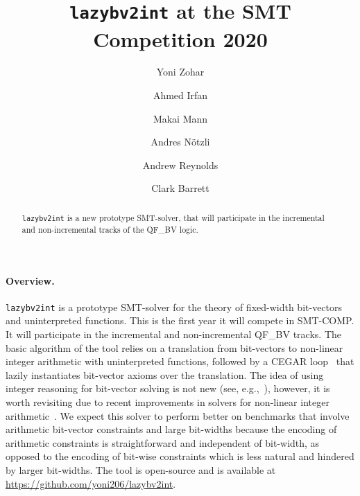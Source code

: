 \documentclass{easychair}
\newcommand{\lazybvtoint}{\texttt{lazybv2int}\xspace}
\newcommand{\smtcomp}{SMT-COMP\xspace}
\newcommand{\qfbv}{QF\_BV\xspace}
\begin{document}
\author{
		Yoni Zohar\and
		Ahmed Irfan \and
		Makai Mann \and
		Andres N\"otzli \and
		Andrew Reynolds\and
		Clark Barrett
}

\title{\lazybvtoint at the SMT Competition 2020}

\titlerunning{}
\authorrunning{}

\maketitle


\noindent
\begin{abstract}
\noindent \lazybvtoint is a new prototype SMT-solver, that will participate in
the incremental and non-incremental tracks of the \qfbv logic.
\end{abstract}

\paragraph{Overview.}
\lazybvtoint is a prototype SMT-solver for the theory of fixed-width bit-vectors
and uninterpreted functions. This is the first year it will compete in \smtcomp.
It will participate in the incremental and non-incremental \qfbv tracks.
%
The basic algorithm of the tool relies on a translation from bit-vectors to
non-linear integer arithmetic with uninterpreted functions, followed by a CEGAR
loop~\cite{cegar} that lazily instantiates bit-vector axioms over the
translation. The idea of using integer reasoning for bit-vector solving is not
new (see,
e.g.,~\cite{DBLP:journals/entcs/BozzanoBCFHKPS06,DBLP:conf/fmcad/BackemanRZ18}),
however, it is worth revisiting due to recent improvements in solvers for
non-linear integer arithmetic~\cite{DBLP:conf/vmcai/Jovanovic17,
  DBLP:conf/sat/CimattiGIRS18}.
%
We expect this solver to perform better on benchmarks that involve arithmetic
bit-vector constraints and large bit-widths because the encoding of arithmetic
constraints is straightforward and independent of bit-width, as opposed to the
encoding of bit-wise constraints which is less natural and hindered by larger
bit-widths.
%
The tool is open-source and is available at \url{https://github.com/yoni206/lazybv2int}.
\end{document}
